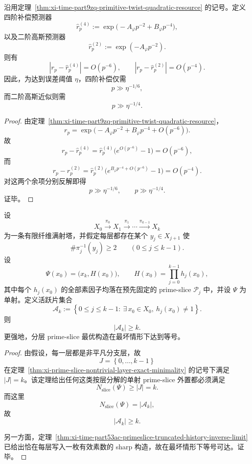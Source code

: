 \begin{corollary}\label{cor:xi-time-part9zq-primitive-twist-fourth-order-compensation}
沿用定理~\ref{thm:xi-time-part9zq-primitive-twist-quadratic-resource} 的记号。定义四阶补偿预测器
\[
\widehat r_p^{(4)}:=\exp\!\bigl(-A_\varphi p^{-2}+B_\varphi p^{-4}\bigr),
\]
以及二阶高斯预测器
\[
\widehat r_p^{(2)}:=\exp(-A_\varphi p^{-2}).
\]
则有
\[
\left|r_p-\widehat r_p^{(4)}\right|=O(p^{-6}),
\qquad
\left|r_p-\widehat r_p^{(2)}\right|=O(p^{-4}).
\]
因此，为达到误差阈值 \(\eta\)，四阶补偿仅需
\[
p\gg \eta^{-1/6},
\]
而二阶高斯近似则需
\[
p\gg \eta^{-1/4}.
\]
\end{corollary}
\begin{proof}
由定理~\ref{thm:xi-time-part9zq-primitive-twist-quadratic-resource}，
\[
r_p
=
\exp\!\bigl(-A_\varphi p^{-2}+B_\varphi p^{-4}+O(p^{-6})\bigr).
\]
故
\[
r_p-\widehat r_p^{(4)}
=
\widehat r_p^{(4)}\bigl(e^{O(p^{-6})}-1\bigr)
=
O(p^{-6}),
\]
而
\[
r_p-\widehat r_p^{(2)}
=
\widehat r_p^{(2)}\bigl(e^{B_\varphi p^{-4}+O(p^{-6})}-1\bigr)
=
O(p^{-4}).
\]
对这两个余项分别反解即得
\[
p\gg \eta^{-1/6},
\qquad
p\gg \eta^{-1/4}.
\]
证毕。
\end{proof}

\begin{theorem}\label{thm:xi-time-part9zq-active-primeslice-linear-growth}
设
\[
X_0\xrightarrow{\pi_0}X_1\xrightarrow{\pi_1}\cdots\xrightarrow{\pi_{k-1}}X_k
\]
为一条有限纤维满射塔，并假定每层都存在某个 \(y_j\in X_{j+1}\) 使
\[
\#\pi_j^{-1}(y_j)\ge 2
\qquad
(0\le j\le k-1).
\]
设
\[
\Psi(x_0)=\bigl(x_k,H(x_0)\bigr),
\qquad
H(x_0)=\prod_{j=0}^{k-1}h_j(x_0),
\]
其中每个 \(h_j(x_0)\) 的全部素因子均落在预先固定的 prime-slice \(\mathcal P_j\) 中，并设 \(\Psi\) 为单射。定义活跃片集合
\[
\mathcal A_k
:=
\left\{
0\le j\le k-1:\ \exists\,x_0\in X_0,\ h_j(x_0)\neq 1
\right\}.
\]
则
\[
|\mathcal A_k|\ge k.
\]
更强地，分层 prime-slice 最优构造在最坏情形下达到等号。
\end{theorem}
\begin{proof}
由假设，每一层都是非平凡分支层，故
\[
J=
\left\{
0,\dots,k-1
\right\}
\]
在定理~\ref{thm:xi-prime-slice-nontrivial-layer-exact-minimality} 的记号下满足 \(|J|=k\)。该定理给出任何这类按层分解的单射 prime-slice 外置都必须满足
\[
N_{\mathrm{slice}}(\Psi)\ge |J|=k.
\]
而这里
\[
N_{\mathrm{slice}}(\Psi)=|\mathcal A_k|,
\]
故
\[
|\mathcal A_k|\ge k.
\]

另一方面，定理~\ref{thm:xi-time-part53ac-primeslice-truncated-history-inverse-limit} 已给出恰在每层写入一枚有效素数的 sharp 构造，故在最坏情形下等号可达。证毕。
\end{proof}


